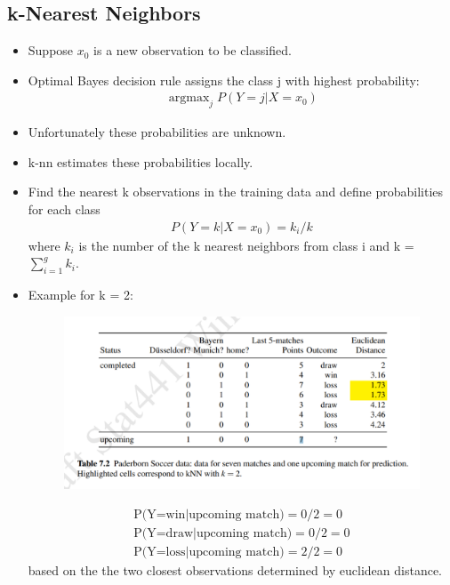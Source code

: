 \documentclass[12pt, oneside]{article}
\DeclareMathOperator*{\argmax}{argmax} %
\begin{document}
\subsection{k-Nearest Neighbors}
\begin{itemize}
    \item Suppose $x_0$ is a new observation to be classified.
    \item Optimal Bayes decision rule assigns the class j with highest probability:
    \begin{align*}
        \argmax_j P(Y=j|X=x_0)
    \end{align*}
    \item Unfortunately these probabilities are unknown. 
    \item k-nn estimates these probabilities locally. 
    \item Find the nearest k observations in the training data and define probabilities for each class
    \begin{align*}
        P(Y=k|X=x_0)=k_i/k
    \end{align*}
    where $k_i$ is the number of the k nearest neighbors from class i and k = $\sum^g_{i=1}k_i$.
    \item Example for k = 2:
    \begin{figure}[ht]
    \centering
     \includegraphics[width=1.0\textwidth]{2-nn-ex.png}
    \end{figure}
    \begin{align*}
        \text{P(Y=win$|$upcoming match)} = 0/2 = 0 \\
        \text{P(Y=draw$|$upcoming match)} = 0/2 = 0 \\ 
        \text{P(Y=loss$|$upcoming match)} = 2/2 = 0 
    \end{align*}
    based on the the two closest observations determined by euclidean distance.
    

\end{itemize}
\end{document}
